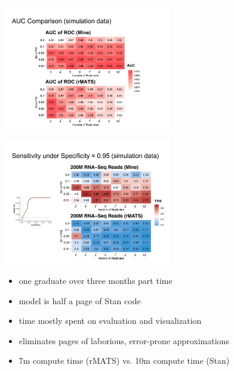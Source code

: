 \documentclass[10pt]{report}
\begin{document}
\begin{center}
\includegraphics[width=0.55\textwidth]{img/auc-shuonan.pdf}
\end{center}

\begin{center}
\includegraphics[width=0.55\textwidth]{img/shuonan-95pct.pdf}
\end{center}

\begin{itemize}
\item one graduate over three months part time
\item model is half a page of Stan code
\item time mostly spent on evaluation and visualization
\item eliminates pages of laborious, error-prone approximations
\item 7m compute time (rMATS) vs. 10m compute time (Stan)
\end{itemize}


\end{document}
